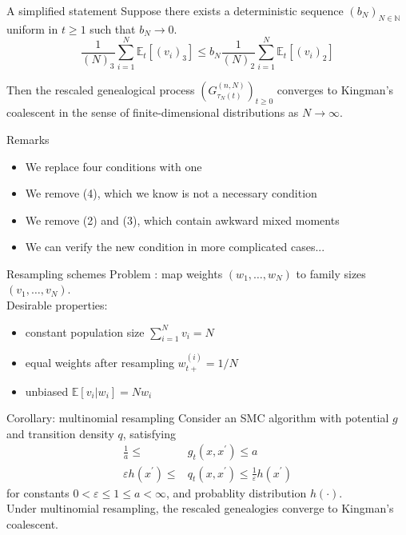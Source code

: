 \documentclass[aspectratio=169]{beamer}
\theoremstyle{definition}
\newcommand{\E}{\mathbb{E}}
\newcommand{\vt}[1]{v_{#1}}
\newcommand{\wt}[1]{w_{#1}}
\newcommand{\Et}{\mathbb{E}_{t}}
\begin{document}
\begin{frame}{A simplified statement}
\vspace{-10pt}
Suppose there exists a deterministic sequence $(b_N)_{N\in\mathbb{N}}$ uniform in $t\geq 1$ such that $b_N \to 0$.
\begin{equation}
\frac{1}{(N)_3} \sum_{i = 1}^N \Et[ (\vt{i})_3 ]  \leq b_N \frac{1}{(N)_2} \sum_{i = 1}^N \Et[ (\vt{i})_2  ]
\end{equation}

Then the rescaled genealogical process $(G_{\tau_N(t)}^{(n,N)})_{t\geq0} $ converges to Kingman's coalescent in the sense of finite-dimensional distributions as $N\to\infty$.
\end{frame}

\begin{frame}{Remarks}
\begin{itemize}
\item We replace four conditions with one
\pause
\item We remove (4), which we know is not a necessary condition
\pause
\item We remove (2) and (3), which contain awkward mixed moments
\pause
\item We can verify the new condition in more complicated cases...
\end{itemize}
\end{frame}

\begin{frame}{Resampling schemes}
Problem : map weights $(\wt{1}, \dots, \wt{N})$ to family sizes $(\vt{1},\dots, \vt{N})$.\\
Desirable properties:
\begin{itemize}
\item constant population size $\sum_{i=1}^N \vt{i} =N$
\item equal weights after resampling $w_{t+}^{(i)} = 1/N$
\item unbiased $\E[\vt{i} | \wt{i}] = N\wt{i}$
\end{itemize}
\end{frame}

\begin{frame}{Corollary: multinomial resampling}
Consider an SMC algorithm with potential $g$ and transition density $q$, satisfying
\begin{align}
\frac{1}{a} \leq &g_t(x, x^\prime) \leq a \\
\varepsilon h(x^\prime) \leq &q_t(x, x^\prime) \leq \frac{1}{\varepsilon} h(x^\prime) 
\end{align}
for constants $0<\varepsilon\leq 1\leq a<\infty$, and probablity distribution $h(\cdot)$.\\[10pt]

Under multinomial resampling, the rescaled genealogies converge to Kingman's coalescent.
\end{frame}
\end{document}
